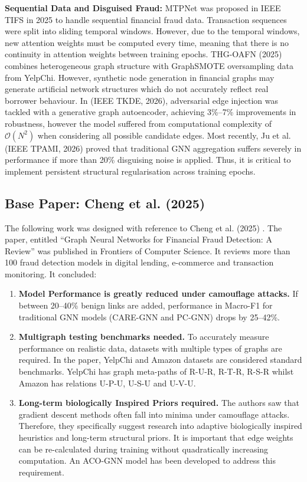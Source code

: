 \textbf{Sequential Data and Disguised Fraud:} MTPNet \cite{mtpnet2025} was proposed in IEEE TIFS in 2025 to handle sequential financial fraud data. Transaction sequences were split into sliding temporal windows. However, due to the temporal windows, new attention weights must be computed every time, meaning that there is no continuity in attention weights between training epochs. THG-OAFN \cite{wei2025internet} (2025) combines heterogeneous graph structure with GraphSMOTE oversampling data from YelpChi. However, synthetic node generation in financial graphs may generate artificial network structures which do not accurately reflect real borrower behaviour. In \cite{wu2026defending} (IEEE TKDE, 2026), adversarial edge injection was tackled with a generative graph autoencoder, achieving 3\%--7\% improvements in robustness, however the model suffered from computational complexity of $\mathcal{O}(N^2)$ when considering all possible candidate edges. Most recently, Ju et al. \cite{ju2026survey} (IEEE TPAMI, 2026) proved that traditional GNN aggregation suffers severely in performance if more than 20\% disguising noise is applied. Thus, it is critical to implement persistent structural regularisation across training epochs.

\subsection{Base Paper: Cheng et al. (2025)}
\label{sec:base_paper_cheng}
The following work was designed with reference to Cheng et al. (2025) \cite{cheng2025graph}. The paper, entitled ``Graph Neural Networks for Financial Fraud Detection: A Review'' was published in Frontiers of Computer Science. It reviews more than 100 fraud detection models in digital lending, e-commerce and transaction monitoring. It concluded:
\begin{enumerate}
    \item \textbf{Model Performance is greatly reduced under camouflage attacks.} If between 20--40\% benign links are added, performance in Macro-F1 for traditional GNN models (CARE-GNN and PC-GNN) drops by 25--42\%.
    \item \textbf{Multigraph testing benchmarks needed.} To accurately measure performance on realistic data, datasets with multiple types of graphs are required. In the paper, YelpChi and Amazon datasets are considered standard benchmarks. YelpChi has graph meta-paths of R-U-R, R-T-R, R-S-R whilst Amazon has relations U-P-U, U-S-U and U-V-U.
    \item \textbf{Long-term biologically Inspired Priors required.} The authors saw that gradient descent methods often fall into minima under camouflage attacks. Therefore, they specifically suggest research into adaptive biologically inspired heuristics and long-term structural priors. It is important that edge weights can be re-calculated during training without quadratically increasing computation. An ACO-GNN model has been developed to address this requirement.
\end{enumerate}

